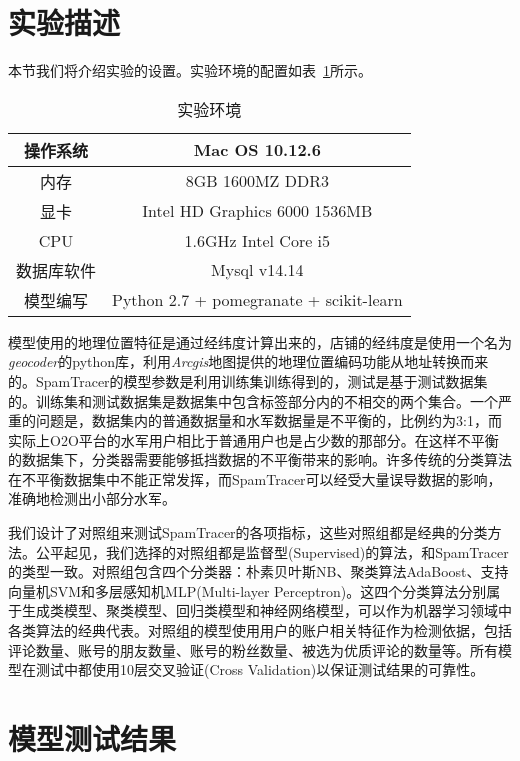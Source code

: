 \section{实验描述}

本节我们将介绍实验的设置。实验环境的配置如表~\ref{tab:environment}所示。

\begin{table}[htbp]
	\caption[实验环境]{实验环境}
	\label{tab:environment}
	\centering
	\begin{tabular}{| c | c |}
		\hline
		\centering
		操作系统 &  Mac OS 10.12.6\\
		\hline
		\centering
		内存 & 8GB 1600MZ DDR3\\
		\hline
		\centering
		显卡 & Intel HD Graphics 6000 1536MB\\
		\hline
		\centering
		CPU & 1.6GHz Intel Core i5\\
		\hline
		\centering
		数据库软件 & Mysql v14.14\\
		\hline
		\centering
		模型编写 & Python 2.7 + pomegranate +
		scikit-learn\\
		\hline
	\end{tabular}
\end{table}

模型使用的地理位置特征是通过经纬度计算出来的，店铺的经纬度是使用一个名为\emph{geocoder}的python库，利用\emph{Arcgis}地图提供的地理位置编码功能从地址转换而来的。SpamTracer的模型参数是利用训练集训练得到的，测试是基于测试数据集的。训练集和测试数据集是数据集中包含标签部分内的不相交的两个集合。一个严重的问题是，数据集内的普通数据量和水军数据量是不平衡的，比例约为3:1，而实际上O2O平台的水军用户相比于普通用户也是占少数的那部分。在这样不平衡的数据集下，分类器需要能够抵挡数据的不平衡带来的影响。许多传统的分类算法在不平衡数据集中不能正常发挥，而SpamTracer可以经受大量误导数据的影响，准确地检测出小部分水军。

我们设计了对照组来测试SpamTracer的各项指标，这些对照组都是经典的分类方法。公平起见，我们选择的对照组都是监督型(Supervised)的算法，和SpamTracer的类型一致。对照组包含四个分类器：朴素贝叶斯NB、聚类算法AdaBoost、支持向量机SVM和多层感知机MLP(Multi-layer Perceptron)。这四个分类算法分别属于生成类模型、聚类模型、回归类模型和神经网络模型，可以作为机器学习领域中各类算法的经典代表。对照组的模型使用用户的账户相关特征作为检测依据，包括评论数量、账号的朋友数量、账号的粉丝数量、被选为优质评论的数量等。所有模型在测试中都使用10层交叉验证(Cross Validation)以保证测试结果的可靠性。


\section{模型测试结果}

